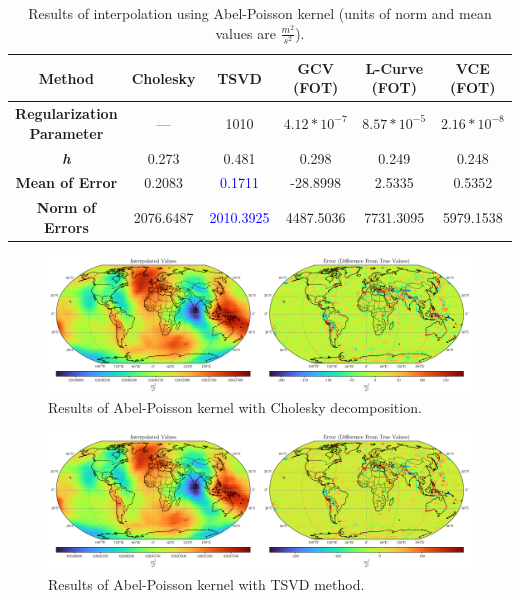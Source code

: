 \documentclass[12pt]{article}
\begin{document}
	\begin{table}[h!]
		\centering
		\caption{Results of interpolation using Abel-Poisson kernel (units of norm and mean values are $\frac{m^2}{s^2}$).}
		\vspace{0.2cm}
		\renewcommand{\arraystretch}{2}
		\begin{tabular}{c|c|c|c|c|c}
			\textbf{Method} & Cholesky & TSVD & GCV (FOT) & L-Curve (FOT) & VCE (FOT) \\
			\hline 
			\makecell{\textbf{Regularization} \\ \textbf{Parameter}} & --- & 1010 & $4.12*10^{-7}$ & $8.57*10^{-5}$ & $2.16*10^{-8}$ \\
			\hline 
			\textit{\textbf{h}} & 0.273 & 0.481 & 0.298 & 0.249 & 0.248 \\
			\hline
			\textbf{Mean of Error} & 0.2083 & \textcolor{blue}{0.1711} & -28.8998 & 2.5335 & 0.5352 \\
			\hline 
			\textbf{Norm of Errors} & 2076.6487 & \textcolor{blue}{2010.3925} & 4487.5036 & 7731.3095 & 5979.1538 \\
		\end{tabular}
		\label{tab:Abel-Poisson_Results}
	\end{table}
	
	\begin{figure}[h!]
		\centering
		\includegraphics[width=16cm]{../Outputs/Plots/Plot_Abel-Poisson_Cholesky.pdf}
		\caption{Results of Abel-Poisson kernel with Cholesky decomposition.}
		\label{fig:Abel-Poisson_Chol}
	\end{figure}
	
	\begin{figure}[h!]
		\centering
		\includegraphics[width=16cm]{../Outputs/Plots/Plot_Abel-Poisson_TSVD.pdf}
		\caption{Results of Abel-Poisson kernel with TSVD method.}
		\label{fig:Abel-Poisson_TSVD}
	\end{figure}
	
\end{document}
